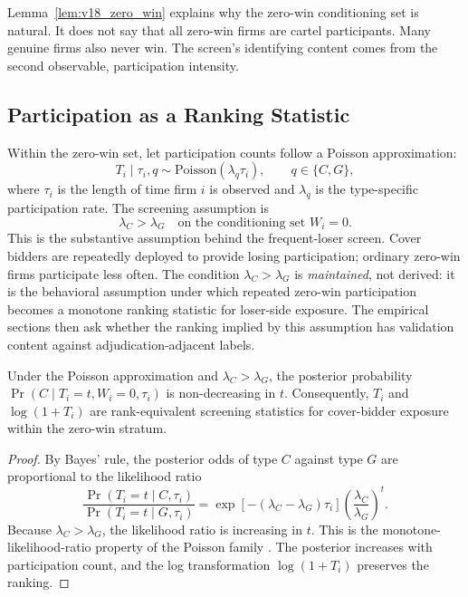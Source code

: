 Lemma~\ref{lem:v18_zero_win} explains why the zero-win
conditioning set is natural. It does not say that all zero-win
firms are cartel participants. Many genuine firms also never
win. The screen's identifying content comes from the second
observable, participation intensity.

\subsection{Participation as a Ranking Statistic}
\label{app:framework_participation}

Within the zero-win set, let participation counts follow a
Poisson approximation:
\[
  T_i \mid \tau_i, q \sim \text{Poisson}(\lambda_q \tau_i),
  \qquad q\in\{C,G\},
\]
where $\tau_i$ is the length of time firm $i$ is observed and
$\lambda_q$ is the type-specific participation rate. The
screening assumption is
\[
  \lambda_C>\lambda_G
  \quad\text{on the conditioning set } W_i=0.
\]
This is the substantive assumption behind the frequent-loser
screen. Cover bidders are repeatedly deployed to provide losing
participation; ordinary zero-win firms participate less often.
The condition $\lambda_C>\lambda_G$ is \emph{maintained}, not
derived: it is the behavioral assumption under which repeated
zero-win participation becomes a monotone ranking statistic for
loser-side exposure. The empirical sections then ask whether
the ranking implied by this assumption has validation content
against adjudication-adjacent labels.

\begin{proposition}
\label{prop:v18_monotone}
Under the Poisson approximation and $\lambda_C>\lambda_G$, the
posterior probability $\Pr(C\mid T_i=t,W_i=0,\tau_i)$ is
non-decreasing in $t$. Consequently, $T_i$ and
$\log(1+T_i)$ are rank-equivalent screening statistics for
cover-bidder exposure within the zero-win stratum.
\end{proposition}

\begin{proof}
By Bayes' rule, the posterior odds of type $C$ against type $G$
are proportional to the likelihood ratio
\[
  \frac{\Pr(T_i=t\mid C,\tau_i)}
       {\Pr(T_i=t\mid G,\tau_i)}
  =
  \exp[-(\lambda_C-\lambda_G)\tau_i]
  \left(\frac{\lambda_C}{\lambda_G}\right)^t .
\]
Because $\lambda_C>\lambda_G$, the likelihood ratio is increasing
in $t$. This is the monotone-likelihood-ratio property of the
Poisson family \citep{karlin1956mlr}. The posterior increases
with participation count, and the log transformation
$\log(1+T_i)$ preserves the ranking.
\end{proof}

